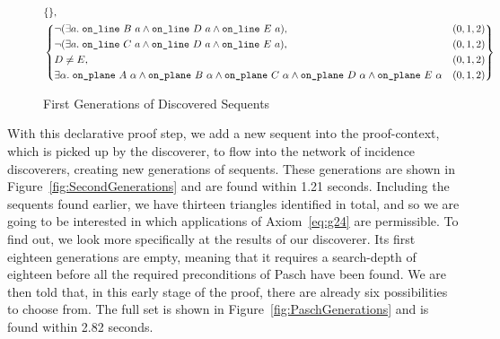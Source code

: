 \begin{figure}[H]
{\begin{minipage}{\boxwidth}
\begin{displaymath}
\begin{split}
      &\{\},\\
    &\left\{\begin{aligned}
        &\Triangle{a}{B}{D}{E}, & (0,1,2)\\
        &\Triangle{a}{C}{D}{E}, & (0,1,2)\\
        &D\neq E, & (0,1,2)\\
      &\exists \alpha.\;\code{on\_plane}\ A\ \alpha\wedge \code{on\_plane}\ B\ \alpha\wedge \code{on\_plane}\ C\ \alpha\wedge\code{on\_plane}\ D\ \alpha\wedge\code{on\_plane}\ E\ \alpha & (0,1,2)
    \end{aligned}\right\}\\
\end{split}
\end{displaymath}
\end{minipage}}
\caption{First Generations of Discovered Sequents}
\label{fig:FirstGenerations}
\end{figure}

With this declarative proof step, we add a new sequent into the proof-context, which is picked up by the  discoverer, to flow into the network of incidence discoverers, creating new generations of sequents. These generations are shown in Figure~\ref{fig:SecondGenerations} and are found within 1.21 seconds. Including the sequents found earlier, we have thirteen triangles identified in total, and so we are going to be interested in which applications of Axiom~\ref{eq:g24} are permissible. To find out, we look more specifically at the results of our  discoverer. Its first eighteen generations are empty, meaning that it requires a search-depth of eighteen before all the required preconditions of Pasch have been found. We are then told that, in this early stage of the proof, there are already six possibilities to choose from. The full set is shown in Figure~\ref{fig:PaschGenerations} and is found within 2.82 seconds.

